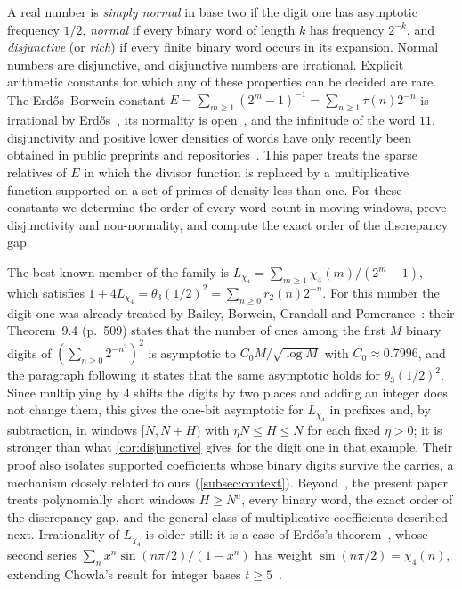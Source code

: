 \documentclass[11pt]{article}
\begin{document}
A real number is \emph{simply normal} in base two if the digit one has
asymptotic frequency $1/2$, \emph{normal} if every binary word of length $k$
has frequency $2^{-k}$, and \emph{disjunctive} (or \emph{rich}) if every finite
binary word occurs in its expansion. Normal numbers are disjunctive, and
disjunctive numbers are irrational. Explicit arithmetic constants for which any
of these properties can be decided are rare. The Erd\H{o}s--Borwein constant
$E=\sum_{m\ge1}(2^m-1)^{-1}=\sum_{n\ge1}\tau(n)2^{-n}$ is irrational by
Erd\H{o}s~\cite{Erdos1948}, its normality is
open~\cite{BaileyCrandall2001,BaileyCrandall2002,Crandall2012},
and the infinitude of the word $11$, disjunctivity and positive lower densities
of words have only recently been obtained in public preprints and repositories~\cite{Campbell2026,SudeDisj,SudeElem,MiraCult}.
This paper treats the sparse relatives of $E$ in which the divisor function is
replaced by a multiplicative function supported on a set of primes of density
less than one. For these constants we determine the order of every word count
in moving windows, prove disjunctivity and non-normality, and compute the exact
order of the discrepancy gap.

The best-known member of the family is
$L_{\chi_4}=\sum_{m\ge1}\chi_4(m)/(2^m-1)$, which satisfies
$1+4L_{\chi_4}=\theta_3(1/2)^2=\sum_{n\ge0}r_2(n)2^{-n}$. For this number the
digit one was already treated by Bailey, Borwein, Crandall and
Pomerance~\cite[\S9]{BBCP2004}: their Theorem~9.4 (p.~509) states that the number
of ones among the first $M$ binary digits of $(\sum_{n\ge0}2^{-n^2})^2$ is
asymptotic to $C_0M/\sqrt{\log M}$ with $C_0\approx0.7996$, and the paragraph
following it states that the same asymptotic holds for $\theta_3(1/2)^2$.
Since multiplying by $4$ shifts the digits by two places and adding an integer
does not change them, this gives the one-bit asymptotic for $L_{\chi_4}$ in
prefixes and, by subtraction, in windows $[N,N+H)$ with $\eta N\le H\le N$ for
each fixed $\eta>0$; it is stronger than what \cref{cor:disjunctive} gives for
the digit one in that example. Their proof also isolates supported
coefficients whose binary digits survive the carries, a mechanism closely
related to ours (\cref{subsec:context}). Beyond~\cite{BBCP2004}, the present
paper treats polynomially short windows $H\ge N^a$, every binary word, the
exact order of the discrepancy gap, and the general class of multiplicative
coefficients described next. Irrationality of $L_{\chi_4}$ is older still: it is
a case of Erd\H{o}s's theorem~\cite{Erdos1948}, whose second series
$\sum_n x^n\sin(n\pi/2)/(1-x^n)$ has weight $\sin(n\pi/2)=\chi_4(n)$, extending
Chowla's result for integer bases $t\ge5$~\cite{Chowla1947}.
\end{document}
